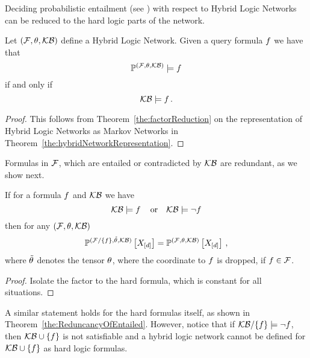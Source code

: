 
Deciding probabilistic entailment (see ) with respect to Hybrid Logic Networks can be reduced to the hard logic parts of the network.

\begin{theorem}
    \label{the:hlnEntailmentReduction}
    Let $(\mathcal{F},\theta,\mathcal{KB})$ define a Hybrid Logic Network.
    Given a query formula $f$ we have that
    \[ \mathbb{P}^{(\mathcal{F},\theta,\mathcal{KB})} \models f \]
    if and only if
    \[ \mathcal{KB} \models f \, . \]
\end{theorem}
\begin{proof}
    This follows from Theorem~\ref{the:factorReduction} on the representation of Hybrid Logic Networks as Markov Networks in Theorem~\ref{the:hybridNetworkRepresentation}.
\end{proof}


Formulas in $\mathcal{F}$, which are entailed or contradicted by $\mathcal{KB}$ are redundant, as we show next.

\begin{theorem}%
    If for a formula $f$ and $\mathcal{KB}$ we have
    \[ \mathcal{KB} \models f \, \quad \text{or} \quad \mathcal{KB} \models \lnot f \]
    then for any $(\mathcal{F},\theta,\mathcal{KB})$
    \[ \mathbb{P}^{(\mathcal{F}/\{f\},\tilde{\theta},\mathcal{KB})}\left[X_{[d]}\right] =  \mathbb{P}^{(\mathcal{F},\theta,\mathcal{KB})}\left[X_{[d]}\right]  \, , \]
    where $\tilde{\theta}$ denotes the tensor $\theta$, where the coordinate to $f$ is dropped, if $f\in\mathcal{F}$.
\end{theorem}
\begin{proof}
    Isolate the factor to the hard formula, which is constant for all situations.
\end{proof}

A similar statement holds for the hard formulas itself, as shown in Theorem~\ref{the:ReduncancyOfEntailed}.
However, notice that if $\mathcal{KB}/\{f\}\models\lnot f$, then $\mathcal{KB}\cup\{f\}$ is not satisfiable and a hybrid logic network cannot be defined for $\mathcal{KB}\cup\{f\}$ as hard logic formulas.


